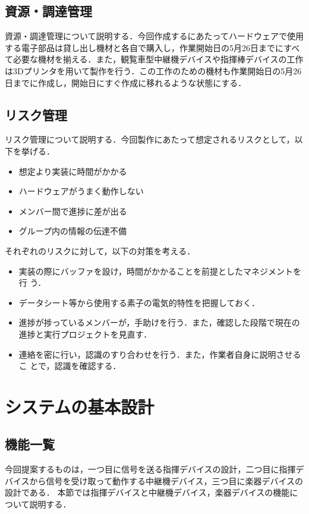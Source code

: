 \documentclass[lualatex,book,paper=a4paper,jafontsize=11.5pt,jafontscale=1.05]{jlreq}
\begin{document}
\section{資源・調達管理}
資源・調達管理について説明する．今回作成するにあたってハードウェアで使用する電子部品は貸し出し機材と各自で購入し，作業開始日の5月26日までにすべて必要な機材を揃える．また，観覧車型中継機デバイスや指揮棒デバイスの工作は3Dプリンタを用いて製作を行う．この工作のための機材も作業開始日の5月26日までに作成し，開始日にすぐ作成に移れるような状態にする．

\section{リスク管理}
リスク管理について説明する．今回製作にあたって想定されるリスクとして，以下を挙げる．
\begin{itemize}
\item 想定より実装に時間がかかる
\item ハードウェアがうまく動作しない
\item  メンバー間で進捗に差が出る
\item グループ内の情報の伝達不備
\end{itemize}
それぞれのリスクに対して，以下の対策を考える．
\begin{itemize}
\item 実装の際にバッファを設け，時間がかかることを前提としたマネジメントを行
う．
\item データシート等から使用する素子の電気的特性を把握しておく．
\item 進捗が捗っているメンバーが，手助けを行う．また，確認した段階で現在の
進捗と実行プロジェクトを見直す．
\item 連絡を密に行い，認識のすり合わせを行う．また，作業者自身に説明させるこ
とで，認識を確認する．
\end{itemize}



\chapter{システムの基本設計}
\section{機能一覧}
今回提案するものは，一つ目に信号を送る指揮デバイスの設計，二つ目に指揮デバイスから信号を受け取って動作する中継機デバイス，三つ目に楽器デバイスの設計である．
本節では指揮デバイスと中継機デバイス，楽器デバイスの機能について説明する．
\end{document}
